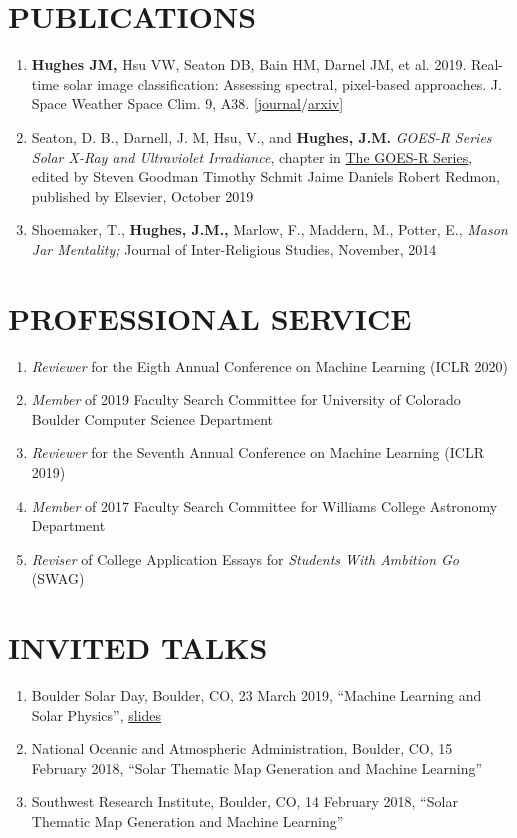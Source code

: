 \documentclass[line,margin]{res}
\begin{document}
\begin{resume}
  \section{PUBLICATIONS}
  \begin{enumerate}[leftmargin=*]
    \item \textbf{Hughes JM,} Hsu VW, Seaton DB, Bain HM, Darnel JM, et al. 2019. Real-time solar image classification: Assessing spectral, pixel-based approaches. J. Space Weather Space Clim. 9, A38. [\href{https://www.swsc-journal.org/articles/swsc/abs/2019/01/swsc180074/swsc180074.html}{journal}/\href{https://arxiv.org/abs/1910.00144}{arxiv}]
    \item Seaton, D. B., Darnell, J. M, Hsu, V., and \textbf{Hughes, J.M.} {\sl GOES-R Series Solar X-Ray and Ultraviolet Irradiance}, chapter in \href{https://www.elsevier.com/books/the-goes-r-series/goodman/978-0-12-814327-8}{The GOES-R Series}, edited by Steven Goodman Timothy Schmit Jaime Daniels Robert Redmon, published by Elsevier, October 2019
  \item  Shoemaker, T., \textbf{Hughes, J.M.,} Marlow, F., Maddern, M., Potter, E., {\sl Mason Jar Mentality;}
    Journal of Inter-Religious Studies, November, 2014

  \end{enumerate}

  
  \section{PROFESSIONAL SERVICE}
  \begin{enumerate}[leftmargin=*]
  \item {\sl Reviewer} for the Eigth Annual Conference on Machine Learning (ICLR 2020)
  \item {\sl Member} of 2019 Faculty Search Committee for University of Colorado Boulder Computer Science Department
  \item {\sl Reviewer} for the Seventh Annual Conference on Machine Learning (ICLR 2019)
  \item {\sl Member} of 2017 Faculty Search Committee for Williams College Astronomy Department
  \item {\sl Reviser} of College Application Essays for \textit{Students With Ambition Go} (SWAG)
  \end{enumerate}

  \section{INVITED TALKS}
  \begin{enumerate}[leftmargin=*]
  \item Boulder Solar Day, Boulder, CO, 23 March 2019, ``Machine Learning and Solar Physics'', \href{https://drive.google.com/open?id=1j5R_wpHwaYO6ZDdx2zjAtdNeyvL2uC9n}{slides}
  \item National Oceanic and Atmospheric Administration, Boulder, CO, 15 February 2018, ``Solar Thematic Map Generation and Machine Learning''
  \item Southwest Research Institute, Boulder, CO, 14 February 2018, ``Solar Thematic Map Generation and Machine Learning''
  \end{enumerate}
  

\end{resume}
\end{document}
